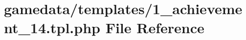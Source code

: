 \hypertarget{1__achievement__14_8tpl_8php}{\section{gamedata/templates/1\+\_\+achievement\+\_\+14.tpl.\+php File Reference}
\label{1__achievement__14_8tpl_8php}
}
